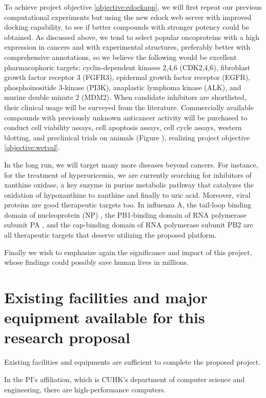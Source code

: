 \documentclass[a4paper,12pt]{article}
\begin{document}
To achieve project objective \ref{objective:edockapp}, we will first repeat our previous computational experiments but using the new edock web server with improved docking capability, to see if better compounds with stronger potency could be obtained. As discussed above, we tend to select popular oncoproteins with a high expression in cancers and with experimental structures, preferably better with comprehensive annotations, so we believe the following would be excellent pharmacophoric targets: cyclin-dependent kinases 2,4,6 (CDK2,4,6), fibroblast growth factor receptor 3 (FGFR3), epidermal growth factor receptor (EGFR), phosphoinositide 3-kinase (PI3K), anaplastic lymphoma kinase (ALK), and murine double minute 2 (MDM2). When candidate inhibitors are shortlisted, their clinical usage will be surveyed from the literature. Commercially available compounds with previously unknown anticancer activity will be purchased to conduct cell viability assays, cell apoptosis assays, cell cycle assays, western blotting, and preclinical trials on animals (Figure ), realizing project objective \ref{objective:wetval}.

In the long run, we will target many more diseases beyond cancers. For instance, for the treatment of hyperuricemia, we are currently searching for inhibitors of xanthine oxidase, a key enzyme in purine metabolic pathway that catalyzes the oxidation of hypoxanthine to xanthine and finally to uric acid. Moreover, viral proteins are good therapeutic targets too. In influenza A, the tail-loop binding domain of nucleoprotein (NP) \citep{1140,1231}, the PB1-binding domain of RNA polymerase subunit PA \citep{1540,1141}, and the cap-binding domain of RNA polymerase subunit PB2 \citep{1192} are all therapeutic targets that deserve utilizing the proposed platform.

Finally we wish to emphasize again the significance and impact of this project, whose findings could possibly save human lives in millions.

\section*{Existing facilities and major equipment available for this research proposal}

Existing facilities and equipments are sufficient to complete the proposed project.

In the PI's affiliation, which is CUHK's department of computer science and engineering, there are high-performance computers.
\end{document}
